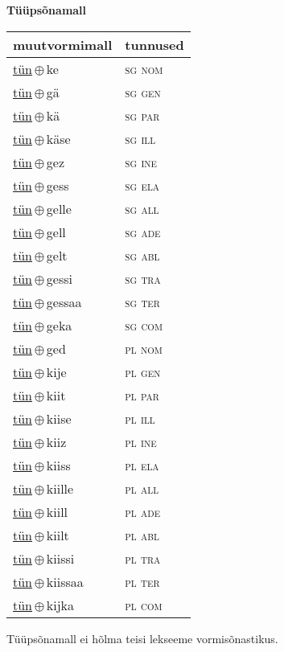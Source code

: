 

\vspace{3.5em}
\noindent \begin{minipage}{\textwidth}
\noindent \textbf{Tüüpsõnamall \,}\\

\begin{sideways}
\begin{tabular}{l l}
muutvormimall & tunnused \\
\hline
\underline{tün}\,$\oplus$\,ke & \textsc{ sg nom } \\
\underline{tün}\,$\oplus$\,gä & \textsc{ sg gen } \\
\underline{tün}\,$\oplus$\,kä & \textsc{ sg par } \\
\underline{tün}\,$\oplus$\,käse & \textsc{ sg ill } \\
\underline{tün}\,$\oplus$\,gez & \textsc{ sg ine } \\
\underline{tün}\,$\oplus$\,gess & \textsc{ sg ela } \\
\underline{tün}\,$\oplus$\,gelle & \textsc{ sg all } \\
\underline{tün}\,$\oplus$\,gell & \textsc{ sg ade } \\
\underline{tün}\,$\oplus$\,gelt & \textsc{ sg abl } \\
\underline{tün}\,$\oplus$\,gessi & \textsc{ sg tra } \\
\underline{tün}\,$\oplus$\,gessaa & \textsc{ sg ter } \\
\underline{tün}\,$\oplus$\,geka & \textsc{ sg com } \\
\underline{tün}\,$\oplus$\,ged & \textsc{ pl nom } \\
\underline{tün}\,$\oplus$\,kije & \textsc{ pl gen } \\
\underline{tün}\,$\oplus$\,kiit & \textsc{ pl par } \\
\underline{tün}\,$\oplus$\,kiise & \textsc{ pl ill } \\
\underline{tün}\,$\oplus$\,kiiz & \textsc{ pl ine } \\
\underline{tün}\,$\oplus$\,kiiss & \textsc{ pl ela } \\
\underline{tün}\,$\oplus$\,kiille & \textsc{ pl all } \\
\underline{tün}\,$\oplus$\,kiill & \textsc{ pl ade } \\
\underline{tün}\,$\oplus$\,kiilt & \textsc{ pl abl } \\
\underline{tün}\,$\oplus$\,kiissi & \textsc{ pl tra } \\
\underline{tün}\,$\oplus$\,kiissaa & \textsc{ pl ter } \\
\underline{tün}\,$\oplus$\,kijka & \textsc{ pl com } \\
\end{tabular}
\end{sideways}
\label{tab:tüüpsõnamall-tünke}

\end{minipage}

 
\vspace{1em}
\noindent Tüüpsõnamall  ei hõlma teisi lekseeme vormi\-sõnastikus.
